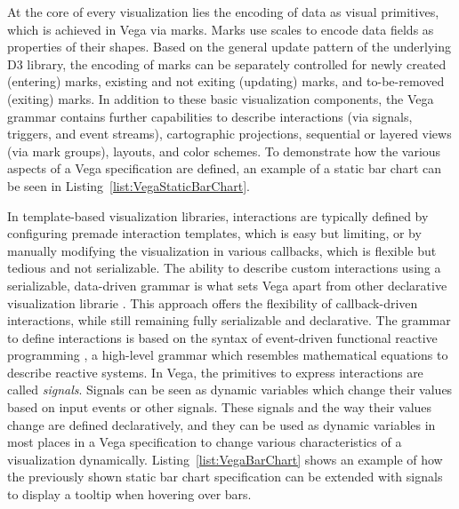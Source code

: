 At the core of every visualization lies the encoding of data as visual
primitives, which is achieved in Vega via marks. Marks use scales to
encode data fields as properties of their shapes. Based on the general
update pattern of the underlying D3 library, the encoding of marks can
be separately controlled for newly created (entering) marks, existing
and not exiting (updating) marks, and to-be-removed (exiting)
marks. In addition to these basic visualization components, the Vega
grammar contains further capabilities to describe interactions (via
signals, triggers, and event streams), cartographic projections,
sequential or layered views (via mark groups), layouts, and color
schemes. To demonstrate how the various aspects of a Vega
specification are defined, an example of a static bar chart can be
seen in Listing~\ref{list:VegaStaticBarChart}.


\begin{samepage}
%
The Vega specification of a static bar chart.
It demonstrates the use of data, scales, axes, and marks
to construct the bar chart.
},
]{listings/vega-static-bar-chart.json}
\end{samepage}


In template-based visualization libraries, interactions are typically
defined by configuring premade interaction templates, which is easy
but limiting, or by manually modifying the visualization in various
callbacks, which is flexible but tedious and not serializable. The
ability to describe custom interactions using a serializable,
data-driven grammar is what sets Vega apart from other declarative
visualization librarie \parencite{ReactiveVega}. This approach offers
the flexibility of callback-driven interactions, while still remaining
fully serializable and declarative. The grammar to define interactions
is based on the syntax of event-driven functional reactive programming
\parencite{EventDrivenFRP}, a high-level grammar which resembles
mathematical equations to describe reactive systems. In Vega, the
primitives to express interactions are called \emph{signals}. Signals
can be seen as dynamic variables which change their values based on
input events or other signals. These signals and the way their values
change are defined declaratively, and they can be used as dynamic
variables in most places in a Vega specification to change various
characteristics of a visualization dynamically.
Listing~\ref{list:VegaBarChart} shows an example of how the previously
shown static bar chart specification can be extended with signals to
display a tooltip when hovering over bars.



